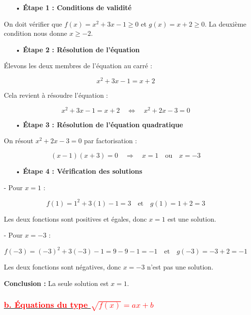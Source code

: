 \documentclass[12pt]{article}
\newcounter{solution}
\begin{document}
\begin{itemize}
    \item[•] \textbf{Étape 1 : Conditions de validité}
\end{itemize}

On doit vérifier que \( f(x) = x^2 + 3x - 1 \geq 0 \) et \( g(x) = x + 2 \geq 0 \). La deuxième condition nous donne \( x \geq -2 \).

\begin{itemize}
    \item[•] \textbf{Étape 2 : Résolution de l'équation}
\end{itemize}

Élevons les deux membres de l'équation au carré :

\[
x^2 + 3x - 1 = x + 2
\]

Cela revient à résoudre l'équation :

\[
x^2 + 3x - 1 = x + 2 \quad \Leftrightarrow \quad x^2 + 2x - 3 = 0
\]

\begin{itemize}
    \item[•] \textbf{Étape 3 : Résolution de l'équation quadratique}
\end{itemize}

On résout \( x^2 + 2x - 3 = 0 \) par factorisation :

\[
(x - 1)(x + 3) = 0 \quad \Rightarrow \quad x = 1 \quad \text{ou} \quad x = -3
\]

\begin{itemize}
    \item[•] \textbf{Étape 4 : Vérification des solutions}
\end{itemize}

- Pour \( x = 1 \) :

\[
f(1) = 1^2 + 3(1) - 1 = 3 \quad \text{et} \quad g(1) = 1 + 2 = 3
\]

Les deux fonctions sont positives et égales, donc \( x = 1 \) est une solution.

- Pour \( x = -3 \) :

\[
f(-3) = (-3)^2 + 3(-3) - 1 = 9 - 9 - 1 = -1 \quad \text{et} \quad g(-3) = -3 + 2 = -1
\]

Les deux fonctions sont négatives, donc \( x = -3 \) n'est pas une solution.

\textbf{Conclusion :} La seule solution est \( x = 1 \).

\subsubsection*{\underline{\textbf{\textcolor{red}{b. Équations du type \( \sqrt{f(x)} = ax + b \)}}}}
\end{document}
